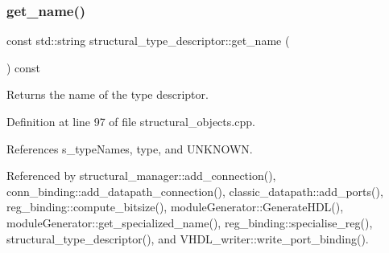 \subsubsection{\texorpdfstring{get\+\_\+name()}{get\_name()}}
{\footnotesize\ttfamily const std\+::string structural\+\_\+type\+\_\+descriptor\+::get\+\_\+name (\begin{DoxyParamCaption}{ }\end{DoxyParamCaption}) const}



Returns the name of the type descriptor. 



Definition at line 97 of file structural\+\_\+objects.\+cpp.



References s\+\_\+type\+Names, type, and U\+N\+K\+N\+O\+WN.



Referenced by structural\+\_\+manager\+::add\+\_\+connection(), conn\+\_\+binding\+::add\+\_\+datapath\+\_\+connection(), classic\+\_\+datapath\+::add\+\_\+ports(), reg\+\_\+binding\+::compute\+\_\+bitsize(), module\+Generator\+::\+Generate\+H\+D\+L(), module\+Generator\+::get\+\_\+specialized\+\_\+name(), reg\+\_\+binding\+::specialise\+\_\+reg(), structural\+\_\+type\+\_\+descriptor(), and V\+H\+D\+L\+\_\+writer\+::write\+\_\+port\+\_\+binding().

